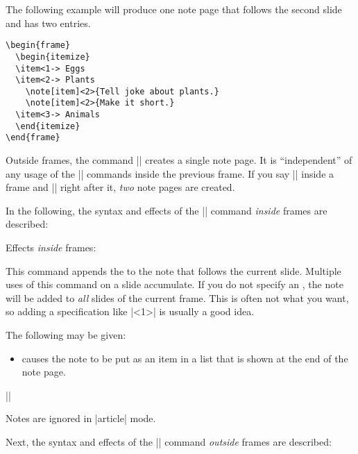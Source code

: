 The following example will produce one note page that follows the second slide and has two entries.
\begin{verbatim}
\begin{frame}
  \begin{itemize}
  \item<1-> Eggs
  \item<2-> Plants
    \note[item]<2>{Tell joke about plants.}
    \note[item]<2>{Make it short.}
  \item<3-> Animals
  \end{itemize}
\end{frame}
\end{verbatim}

Outside frames, the command |\note| creates a single note page. It is ``independent'' of any usage of the |\note| commands inside the previous frame. If you say |\note| inside a frame and |\note| right after it, \emph{two} note pages are created.

In the following, the syntax and effects of the |\note| command \emph{inside} frames are described:

\begin{command}{\note{}}
  Effects \emph{inside} frames:

  This command appends the  to the note that follows the current slide. Multiple uses of this command on a slide accumulate. If you do not specify an , the note will be added to \emph{all} slides of the current frame. This is often not what you want, so adding a specification like |<1>| is usually a good idea.

  The following  may be given:
  \begin{itemize}
  \item
     causes the note to be put as an item in a list that is shown at the end of the note page.
  \end{itemize}

  \example||

  \articlenote
  Notes are ignored in |article| mode.

\end{command}

Next, the syntax and effects of the |\note| command \emph{outside} frames are described:

